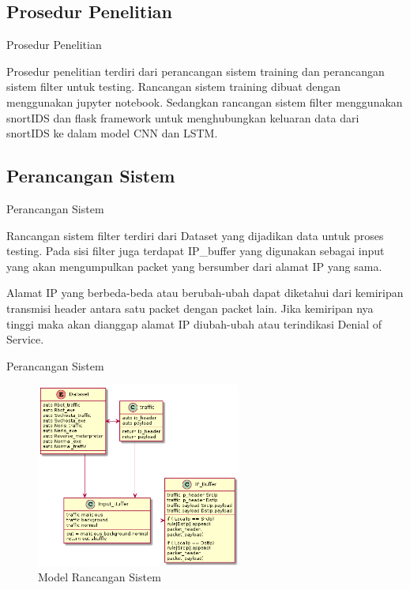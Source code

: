 \documentclass[t]{beamer}
\begin{document}
\subsection{Prosedur Penelitian}
\begin{frame}{Prosedur Penelitian}
	\par Prosedur penelitian terdiri dari perancangan sistem training dan perancangan sistem filter untuk testing. Rancangan sistem training dibuat dengan menggunakan jupyter notebook. Sedangkan rancangan sistem filter menggunakan snortIDS dan flask framework untuk menghubungkan keluaran data dari snortIDS ke dalam model CNN dan LSTM.
\end{frame}
\subsection{Perancangan Sistem}
\begin{frame}{Perancangan Sistem}
	\par Rancangan sistem filter terdiri dari Dataset yang dijadikan data untuk proses testing. Pada sisi filter juga terdapat IP\_buffer yang digunakan sebagai input yang akan mengumpulkan packet yang bersumber dari alamat IP yang sama.
	\par Alamat IP yang berbeda-beda atau berubah-ubah dapat diketahui dari kemiripan transmisi header antara satu packet dengan packet lain. Jika kemiripan nya tinggi maka akan dianggap alamat IP diubah-ubah atau terindikasi Denial of Service.
\end{frame}
\begin{frame}{Perancangan Sistem}
	\begin{figure}[H]
		\centering
		\includegraphics[width=0.6\textwidth]{public/assets/img/RancanganSistemPenelitian.png}
		\caption{Model Rancangan Sistem}
		\label{fig:rancanganpenelitian}
	\end{figure}
\end{frame}
\end{document}
